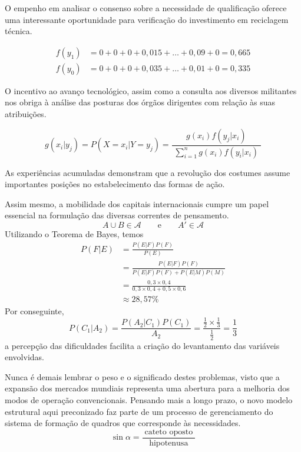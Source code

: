 \begin{apendicesenv}
    O empenho em analisar o consenso sobre a necessidade de qualificação oferece uma
    interessante oportunidade para verificação do investimento em reciclagem
    técnica.

    \begin{align*}
        f(y_1) & = 0 + 0 + 0 + 0,015 + \dots + 0,09 + 0 = 0,665 \\
        f(y_0) & = 0 + 0 + 0 + 0,035 + \dots + 0,01 + 0 = 0,335
    \end{align*}

    O incentivo ao avanço tecnológico, assim como a consulta aos diversos militantes nos obriga
    à análise das posturas dos órgãos dirigentes com relação às suas atribuições.

    \[
        g(x_i|y_j) = P(X=x_i|Y=y_j) = \frac{g(x_i) f(y_j|x_i)}{\displaystyle\;\sum_{i=1}^{n} g(x_i) f(y_i|x_i)\;}
    \]

    As experiências acumuladas demonstram que a revolução dos costumes
    assume importantes posições no estabelecimento das formas de ação.

    Assim mesmo, a mobilidade dos capitais internacionais cumpre um papel essencial
    na formulação das diversas correntes de pensamento.
    \[ A\cup B \in \mathcal{A} \qquad  \text{e} \qquad  A'\in \mathcal{A} \]
    Utilizando o Teorema de Bayes, temos
    \begin{align*}
        P(F|E) & = \frac{P(E|F)P(F)}{P(E)}                                \\[3mm]
               & = \frac{P(E|F)P(F)}{P(E|F)P(F) + P(E|M)P(M)}             \\[3mm]
               & = \frac{0,3 \times 0,4}{0,3 \times 0,4 + 0,5 \times 0,6} \\[3mm]
               & \approx 28,57\%
    \end{align*}
    Por conseguinte,
    \[
        P(C_{1}|A_{2}) = \frac{P(A_{2}|C_{1})P(C_{1})}{A_{2}}
        = \frac{\frac{1}{2} \times \frac{1}{3}}{\frac{1}{2}}
        = \frac{1}{3}
    \]
    a percepção das dificuldades facilita a criação do levantamento
    das variáveis envolvidas.

    Nunca é demais lembrar o peso e o significado destes
    problemas, visto que a expansão dos mercados mundiais representa uma abertura
    para a melhoria dos modos de operação convencionais. Pensando mais a longo
    prazo, o novo modelo estrutural aqui preconizado faz parte de um processo de
    gerenciamento do sistema de formação de quadros que corresponde às necessidades.
    \[
        \sin \alpha = \frac{\;\text{cateto oposto}\;}{\text{hipotenusa}}
    \]


\end{apendicesenv}
